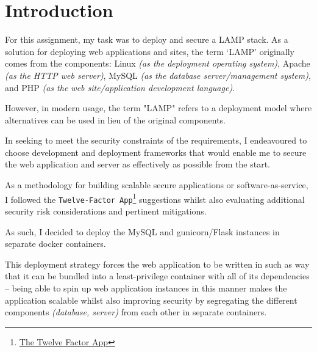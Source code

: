 \section{Introduction}
For this assignment, my task was to deploy and secure a LAMP stack. As a solution for deploying web applications and sites, the term `LAMP' originally comes from the components: Linux \textit{(as the deployment operating system)}, Apache \textit{(as the HTTP web server)}, MySQL \textit{(as the database server/management system)}, and PHP \textit{(as the web site/application development language)}.

However, in modern usage, the term "LAMP" refers to a deployment model where alternatives can be used in lieu of the original components.

In seeking to meet the security constraints of the requirements, I endeavoured to choose development and deployment frameworks that would enable me to secure the web application and server as effectively as possible from the start.

As a methodology for building scalable secure applications or software-as-service, I followed the \texttt{Twelve-Factor App}\footnote{\href{https://12factor.net/}{The Twelve Factor App}} suggestions whilst also evaluating additional security risk considerations and pertinent mitigations.

As such, I decided to deploy the MySQL and gunicorn/Flask instances in separate docker containers.

This deployment strategy forces the web application to be written in such as way that it can be bundled into a least-privilege container with all of its dependencies -- being able to spin up web application instances in this manner makes the application scalable whilst also improving security by segregating the different components \textit{(database, server)} from each other in separate containers.

